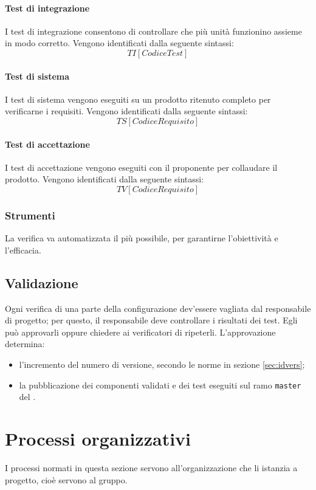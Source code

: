 	\paragraph{Test di integrazione}
		I test di integrazione consentono di controllare che più unità funzionino assieme in modo corretto. Vengono identificati dalla seguente sintassi:
			\[TI[Codice Test]\]
	\paragraph{Test di sistema}
		I test di sistema vengono eseguiti su un prodotto ritenuto completo per verificarne i requisiti. Vengono identificati dalla seguente sintassi:
			\[TS[Codice Requisito]\]
	\paragraph{Test di accettazione}
		I test di accettazione vengono eseguiti con il proponente per collaudare il prodotto. Vengono identificati dalla seguente sintassi:
			\[TV[Codice Requisito]\]

	\subsubsection{Strumenti}
	La verifica va automatizzata il più possibile, per garantirne l'obiettività e l'efficacia. %

\subsection{Validazione}
Ogni verifica di una parte della configurazione dev'essere vagliata dal responsabile di progetto; per questo, il responsabile deve controllare i risultati dei test. Egli può approvarli oppure chiedere ai verificatori di ripeterli. L'approvazione determina:
\begin{itemize}
	\item l'incremento del numero di versione, secondo le norme in sezione \ref{sec:idvers};
	\item la pubblicazione dei componenti validati e dei test eseguiti sul ramo \texttt{master} del .
\end{itemize}




\section{Processi organizzativi} \label{sec:organizzativi}
I processi normati in questa sezione servono all'organizzazione che li istanzia a progetto, cioè servono al gruppo.



